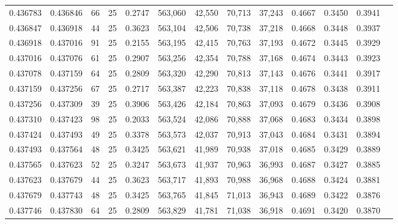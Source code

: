 \begin{tabular}{rrrrrrrrrrrrr}
0.436783 & 0.436846 &    66 &  25 &                                     0.2747 & 563,060 &  42,550 &  70,713 &  37,243 & 0.4667 & 0.3450 & 0.3941 \\
0.436847 & 0.436918 &    44 &  25 &                                     0.3623 & 563,104 &  42,506 &  70,738 &  37,218 & 0.4668 & 0.3448 & 0.3937 \\
0.436918 & 0.437016 &    91 &  25 &                                     0.2155 & 563,195 &  42,415 &  70,763 &  37,193 & 0.4672 & 0.3445 & 0.3929 \\
0.437016 & 0.437076 &    61 &  25 &                                     0.2907 & 563,256 &  42,354 &  70,788 &  37,168 & 0.4674 & 0.3443 & 0.3923 \\
0.437078 & 0.437159 &    64 &  25 &                                     0.2809 & 563,320 &  42,290 &  70,813 &  37,143 & 0.4676 & 0.3441 & 0.3917 \\
0.437159 & 0.437256 &    67 &  25 &                                     0.2717 & 563,387 &  42,223 &  70,838 &  37,118 & 0.4678 & 0.3438 & 0.3911 \\
0.437256 & 0.437309 &    39 &  25 &                                     0.3906 & 563,426 &  42,184 &  70,863 &  37,093 & 0.4679 & 0.3436 & 0.3908 \\
0.437310 & 0.437423 &    98 &  25 &                                     0.2033 & 563,524 &  42,086 &  70,888 &  37,068 & 0.4683 & 0.3434 & 0.3898 \\
0.437424 & 0.437493 &    49 &  25 &                                     0.3378 & 563,573 &  42,037 &  70,913 &  37,043 & 0.4684 & 0.3431 & 0.3894 \\
0.437493 & 0.437564 &    48 &  25 &                                     0.3425 & 563,621 &  41,989 &  70,938 &  37,018 & 0.4685 & 0.3429 & 0.3889 \\
0.437565 & 0.437623 &    52 &  25 &                                     0.3247 & 563,673 &  41,937 &  70,963 &  36,993 & 0.4687 & 0.3427 & 0.3885 \\
0.437623 & 0.437679 &    44 &  25 &                                     0.3623 & 563,717 &  41,893 &  70,988 &  36,968 & 0.4688 & 0.3424 & 0.3881 \\
0.437679 & 0.437743 &    48 &  25 &                                     0.3425 & 563,765 &  41,845 &  71,013 &  36,943 & 0.4689 & 0.3422 & 0.3876 \\
0.437746 & 0.437830 &    64 &  25 &                                     0.2809 & 563,829 &  41,781 &  71,038 &  36,918 & 0.4691 & 0.3420 & 0.3870 \\

\end{tabular}
